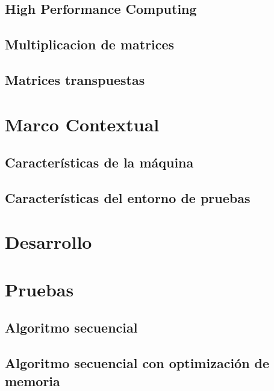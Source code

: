 \documentclass[12pt, letterpaper]{article}
\begin{document}
\subsection{High Performance Computing}

\subsection{Multiplicacion de matrices}

\subsection{Matrices transpuestas}

\section{Marco Contextual}

\subsection{Características de la máquina}

\subsection{Características del entorno de pruebas}

\section{Desarrollo}

\section{Pruebas}

\subsection{Algoritmo secuencial}

\subsection{Algoritmo secuencial con optimización de memoria}
\end{document}
